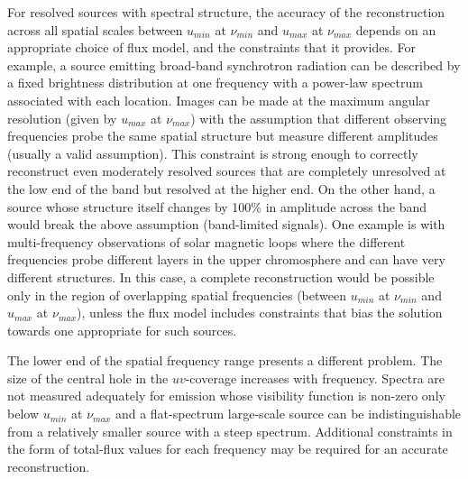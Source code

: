 \documentclass[structabstract]{stylefiles/aa}
\begin{document}
For resolved sources with spectral structure, the accuracy of the reconstruction
across all spatial scales between $u_{min}$ at $\nu_{min}$ and  $u_{max}$ at $\nu_{max}$
depends on an appropriate choice of flux model, and the constraints that it provides.
For example, a source emitting broad-band synchrotron radiation can be described by
a fixed brightness 
distribution at one frequency with a power-law spectrum associated with each location. 
Images can be made at the maximum angular resolution (given by $u_{max}$ at $\nu_{max}$)
with the 
assumption that different observing frequencies probe the same spatial 
structure but measure different amplitudes (usually a valid assumption). 
This constraint is strong enough to correctly reconstruct even moderately resolved sources
that are completely unresolved at the low end of the band but resolved at the higher end.
On the other hand, a source whose structure itself changes by 100\% in amplitude 
across the band would break the above assumption (band-limited signals).
One example is with multi-frequency observations of solar magnetic loops
where the different frequencies probe different layers in the upper chromosphere
and can have very different structures. 
In this case, a complete reconstruction would be possible only in the region of
overlapping spatial frequencies (between $u_{min}$ at $\nu_{min}$ and  $u_{max}$ at $\nu_{max}$),
unless the flux model includes constraints that bias the solution towards one
appropriate for such sources.

The lower end of the spatial frequency range presents a different problem. 
The size of the central hole in the $uv$-coverage
increases with frequency. Spectra are not measured adequately for
emission whose visibility function is non-zero only %
below $u_{min}$ at $\nu_{max}$ and a flat-spectrum large-scale source can
be indistinguishable from a relatively smaller source with a steep spectrum.
Additional constraints in the form 
of total-flux values for each frequency may be required for an accurate reconstruction.
\end{document}
